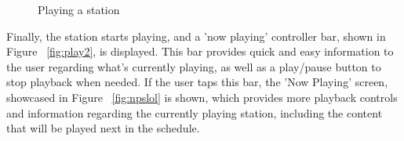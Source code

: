 \begin{figure}[htbp]
	\centering
	 \qquad
	 \qquad
	\caption{Playing a station}
	\label{fig:mfp1}
\end{figure}

\newpage

Finally, the station starts playing, and a 'now playing' controller bar, shown in Figure ~\ref{fig:play2}, is displayed. This bar provides quick and easy information to the user regarding what's currently playing, as well as a play/pause button to stop playback when needed. If the user taps this bar, the 'Now Playing' screen, showcased in Figure ~\ref{fig:npslol} is shown, which provides more playback controls and information regarding the currently playing station, including the content that will be played next in the schedule.

